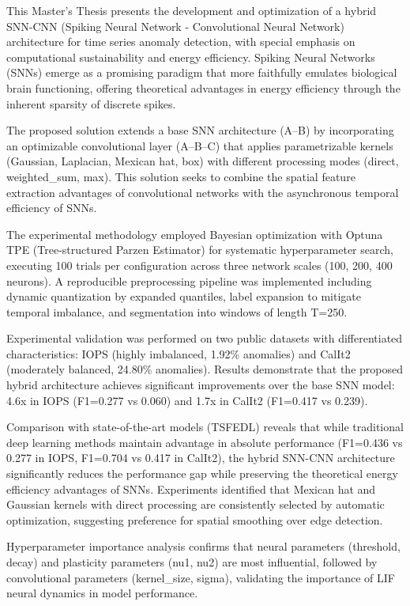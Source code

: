 This Master's Thesis presents the development and optimization of a hybrid SNN-CNN (Spiking Neural Network - Convolutional Neural Network) architecture for time series anomaly detection, with special emphasis on computational sustainability and energy efficiency. Spiking Neural Networks (SNNs) emerge as a promising paradigm that more faithfully emulates biological brain functioning, offering theoretical advantages in energy efficiency through the inherent sparsity of discrete spikes.

The proposed solution extends a base SNN architecture (A--B) by incorporating an optimizable convolutional layer (A--B--C) that applies parametrizable kernels (Gaussian, Laplacian, Mexican hat, box) with different processing modes (direct, weighted\_sum, max). This solution seeks to combine the spatial feature extraction advantages of convolutional networks with the asynchronous temporal efficiency of SNNs.

The experimental methodology employed Bayesian optimization with Optuna TPE (Tree-structured Parzen Estimator) for systematic hyperparameter search, executing 100 trials per configuration across three network scales (100, 200, 400 neurons). A reproducible preprocessing pipeline was implemented including dynamic quantization by expanded quantiles, label expansion to mitigate temporal imbalance, and segmentation into windows of length T=250.

Experimental validation was performed on two public datasets with differentiated characteristics: IOPS (highly imbalanced, 1.92\% anomalies) and CalIt2 (moderately balanced, 24.80\% anomalies). Results demonstrate that the proposed hybrid architecture achieves significant improvements over the base SNN model: 4.6x in IOPS (F1=0.277 vs 0.060) and 1.7x in CalIt2 (F1=0.417 vs 0.239).

Comparison with state-of-the-art models (TSFEDL) reveals that while traditional deep learning methods maintain advantage in absolute performance (F1=0.436 vs 0.277 in IOPS, F1=0.704 vs 0.417 in CalIt2), the hybrid SNN-CNN architecture significantly reduces the performance gap while preserving the theoretical energy efficiency advantages of SNNs. Experiments identified that Mexican hat and Gaussian kernels with direct processing are consistently selected by automatic optimization, suggesting preference for spatial smoothing over edge detection.

Hyperparameter importance analysis confirms that neural parameters (threshold, decay) and plasticity parameters (nu1, nu2) are most influential, followed by convolutional parameters (kernel\_size, sigma), validating the importance of LIF neural dynamics in model performance.


